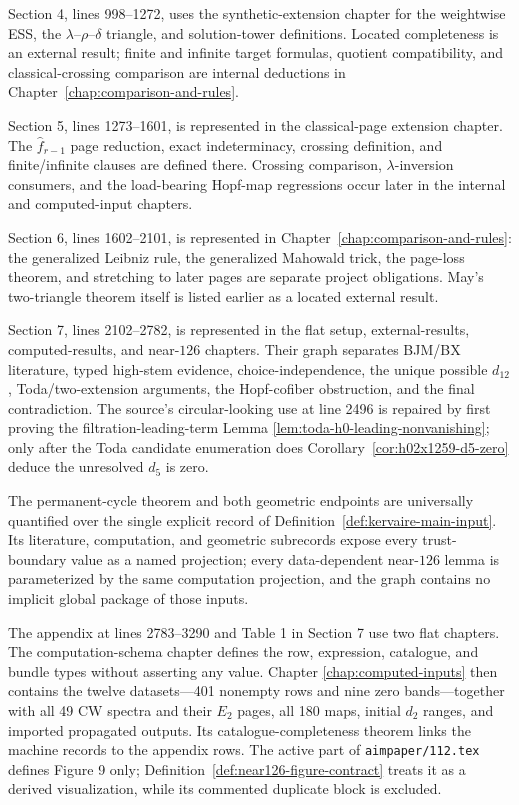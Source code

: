Section 4, lines 998--1272, uses the synthetic-extension chapter for the
weightwise ESS, the $\lambda$--$\rho$--$\delta$ triangle, and solution-tower
definitions.  Located completeness is an external result; finite and infinite
target formulas, quotient compatibility, and classical-crossing comparison
are internal deductions in Chapter~\ref{chap:comparison-and-rules}.

Section 5, lines 1273--1601, is represented in the classical-page extension
chapter.  The $\widehat f_{r-1}$ page reduction, exact indeterminacy, crossing
definition, and finite/infinite clauses are defined there.  Crossing
comparison, $\lambda$-inversion consumers, and the load-bearing Hopf-map
regressions occur later in the internal and computed-input chapters.

Section 6, lines 1602--2101, is represented in
Chapter~\ref{chap:comparison-and-rules}: the generalized Leibniz rule, the
generalized Mahowald trick, the page-loss theorem, and stretching to later
pages are separate project obligations.  May's two-triangle theorem itself is
listed earlier as a located external result.

Section 7, lines 2102--2782, is represented in
the flat setup, external-results, computed-results, and near-$126$ chapters.
Their graph separates BJM/BX literature, typed high-stem evidence,
choice-independence, the unique possible $d_{12}$,
Toda/two-extension arguments, the Hopf-cofiber obstruction, and the final
contradiction.  The source's circular-looking use at line 2496 is repaired by
first proving the filtration-leading-term Lemma
\ref{lem:toda-h0-leading-nonvanishing}; only after the Toda candidate
enumeration does Corollary~\ref{cor:h02x1259-d5-zero} deduce the unresolved
$d_5$ is zero.

The permanent-cycle theorem and both geometric endpoints are universally
quantified over the single explicit record of
Definition~\ref{def:kervaire-main-input}.  Its literature, computation, and
geometric subrecords expose every trust-boundary value as a named projection;
every data-dependent near-$126$ lemma is parameterized by the same computation
projection, and the graph contains no implicit global package of those inputs.

The appendix at lines 2783--3290 and Table 1 in Section 7 use two flat
chapters.  The computation-schema chapter defines the row, expression,
catalogue, and bundle types without asserting any value.  Chapter
\ref{chap:computed-inputs} then contains the twelve datasets---401 nonempty rows
and nine zero bands---together with all 49 CW spectra and their $E_2$ pages,
all 180 maps, initial $d_2$ ranges, and imported propagated outputs.  Its
catalogue-completeness theorem links the machine records to the appendix rows.
The active part of \texttt{aimpaper/112.tex} defines Figure 9 only;
Definition~\ref{def:near126-figure-contract} treats it as a derived
visualization, while its commented duplicate block is excluded.

